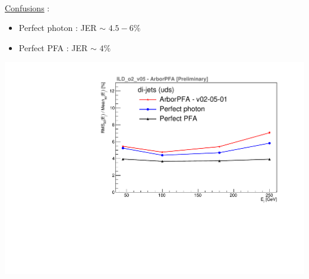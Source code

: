 \documentclass[8pt]{beamer}
\begin{document}
\begin{frame}
\begin{minipage}{0.49\linewidth}
      ~ \\
      \underline{Confusions} :
      \begin{itemize}
        \item Perfect photon : JER $\sim$ $4.5-6\%$
        \item Perfect PFA : JER $\sim$ $4\%$
      \end{itemize}
      \begin{center}
        \includegraphics[width=\linewidth]{ILDArborPFA_EResol_NoNeutralHadron.pdf}
      \end{center}
    \end{minipage}
  \end{frame}
\end{document}
